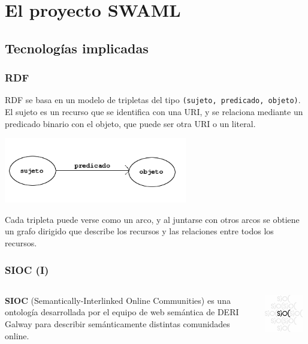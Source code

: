 \documentclass[spanish,notes=hide]{beamer}
\begin{document}
\section{El proyecto SWAML}

\subsection{Tecnologías implicadas}
\frame
{
  \frametitle{RDF}

  RDF se basa en un modelo de tripletas del tipo \texttt{(sujeto, predicado, objeto)}. El
  sujeto es un recurso que se identifica con una URI, y se relaciona mediante un 
  predicado binario con el objeto, que puede ser otra URI o un literal.

  \begin{center}
    \includegraphics[width=0.6\textwidth]{images/arc.png}
  \end{center}

  Cada tripleta puede verse como un arco, y al juntarse con otros arcos se obtiene
  un grafo dirigido que describe los recursos y las relaciones entre todos los 
  recursos.
}
\frame
{
  \frametitle{SIOC (I)}

  \begin{columns}
   \begin{column}{0.6\textwidth}
     \begin{center}
	\textbf{SIOC} (Semantically-Interlinked Online Communities) es una ontología desarrollada 
	por el equipo de web semántica de DERI Galway para describir semánticamente 
	distintas comunidades online.
     \end{center}
   \end{column}
   \begin{column}{0.4\textwidth}
	\includegraphics[width=0.9\textwidth]{images/sioc.png}
   \end{column}
  \end{columns}
}
\end{document}
